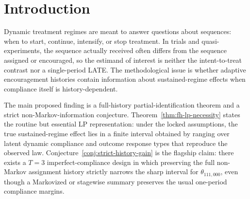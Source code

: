 \documentclass[11pt]{article}
\theoremstyle{definition}
\theoremstyle{plain}
\theoremstyle{remark}
\begin{document}
\begin{abstract}
Sequential encouragement designs with noncompliance are increasingly used to learn dynamic treatment regimes, but existing partial-identification theory usually separates the dynamic-regime question from the sharp noncompliance-bounds question.  This proposal asks whether the full observed history used by an adaptive, non-Markov encouragement policy carries sharp identifying content that is lost by Markov or stagewise IV summaries.  The kernel conjecture is that, already at \(T=3\), two designs with the same stagewise compliance margins can have different sharp bounds for \(\theta_{111,000}\) because full-history assignment creates cross-history constraints on the same latent compliance response map.  Resolving this would give a Balke--Pearl-style finite LP for dynamic imperfect-compliance experiments and a concrete diagnostic for when Bellman-style interval recursions are non-sharp.  If true, the result would connect partial identification, dynamic treatment regimes, and adaptive experimentation in a way that current static IV bounds and Markov off-policy-evaluation results do not.
\end{abstract}

\section{Introduction}
Dynamic treatment regimes are meant to answer questions about sequences: when to start, continue, intensify, or stop treatment.  In trials and quasi-experiments, the sequence actually received often differs from the sequence assigned or encouraged, so the estimand of interest is neither the intent-to-treat contrast nor a single-period LATE.  The methodological issue is whether adaptive encouragement histories contain information about sustained-regime effects when compliance itself is history-dependent.

The main proposed finding is a full-history partial-identification theorem and a strict non-Markov-information conjecture.  Theorem~\ref{thm:fh-lp-necessity} states the routine but essential LP representation: under the locked assumptions, the true sustained-regime effect lies in a finite interval obtained by ranging over latent dynamic compliance and outcome response types that reproduce the observed law.  Conjecture~\ref{conj:strict-history-gain} is the flagship claim: there exists a \(T=3\) imperfect-compliance design in which preserving the full non-Markov assignment history strictly narrows the sharp interval for \(\theta_{111,000}\), even though a Markovized or stagewise summary preserves the usual one-period compliance margins.
\end{document}
